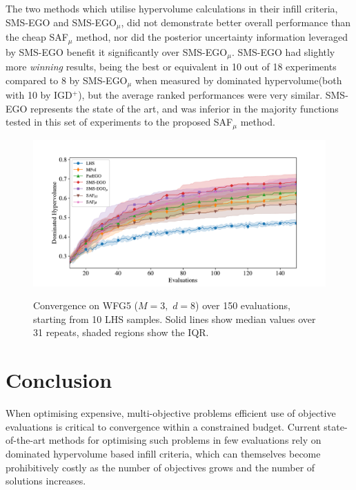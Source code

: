 \documentclass[conference]{IEEEtran}
\newcommand{\ndim}{d}
\newcommand{\nobj}{M}
\newcommand\hpv{dominated hypervolume\xspace}
\newcommand\safmu{SAF$_{\mu}$\xspace}
\newcommand\smsego{SMS-EGO\xspace}
\newcommand\smsegomu{SMS-EGO$_{\mu}$\xspace}
\newcommand\igd{IGD$^+$\xspace}
\begin{document}
The two methods which utilise hypervolume calculations in their infill criteria, \smsego and \smsegomu, did not demonstrate better overall performance than the cheap \safmu method, nor did the posterior uncertainty information leveraged by \smsego benefit it significantly over \smsegomu. \smsego had slightly more \textit{winning} results, being the best or equivalent in 10 out of 18 experiments compared to 8 by \smsegomu when measured by \hpv (both with 10 by \igd), but the average ranked performances were very similar. \smsego represents the state of the art, and was inferior in the majority functions tested in this set of experiments to the proposed \safmu method. 

\begin{figure}[t]
         \centering
         \includegraphics[width=0.9\columnwidth, 
         trim= 16mm 0mm 22mm 15mm, clip]{figures/wfg5_3obj_8dim_hv_plot.pdf}
         \label{fig: exemplar_pf_sms_saf_hv}
\caption{Convergence %
on WFG5 ($\nobj = 3,$ $\ndim = 8$) over 150 evaluations, starting from 10 LHS samples. Solid lines show median values over 31 repeats, shaded regions show the IQR.}
\label{fig: exemplar_hv}
\end{figure}


\section{Conclusion}\label{sec:conclusion}
When optimising expensive, multi-objective problems efficient use of objective evaluations is critical to convergence within a constrained budget. Current state-of-the-art methods for optimising such problems in few evaluations rely on \hpv based infill criteria, which can themselves become prohibitively costly as the number of objectives grows and the number of solutions increases. 
\end{document}
